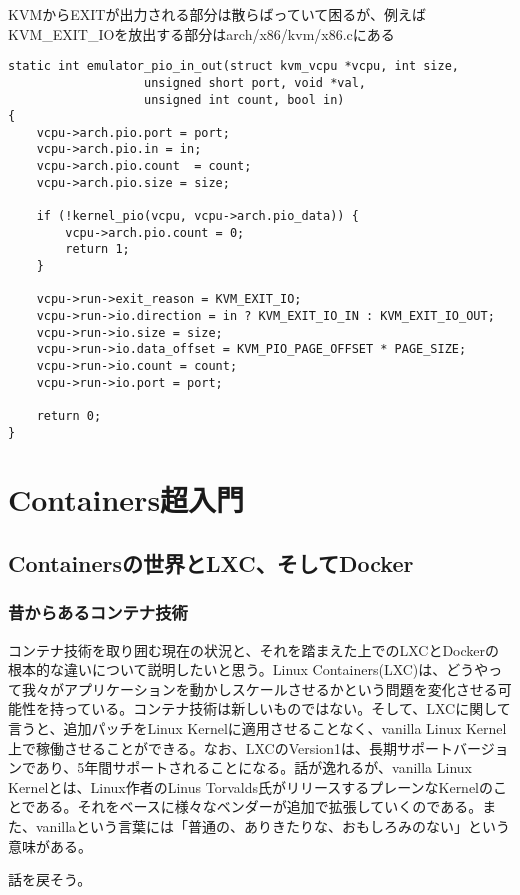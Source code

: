 \documentclass[9pt,b5paper,tombo]{jsbook}
\begin{document}
KVMからEXITが出力される部分は散らばっていて困るが、例えばKVM\_EXIT\_IOを放出する部分はarch/x86/kvm/x86.cにある

\begin{lstlisting}
static int emulator_pio_in_out(struct kvm_vcpu *vcpu, int size,
                   unsigned short port, void *val,
                   unsigned int count, bool in)
{
    vcpu->arch.pio.port = port;
    vcpu->arch.pio.in = in;
    vcpu->arch.pio.count  = count;
    vcpu->arch.pio.size = size;

    if (!kernel_pio(vcpu, vcpu->arch.pio_data)) {
        vcpu->arch.pio.count = 0;
        return 1;
    }

    vcpu->run->exit_reason = KVM_EXIT_IO;
    vcpu->run->io.direction = in ? KVM_EXIT_IO_IN : KVM_EXIT_IO_OUT;
    vcpu->run->io.size = size;
    vcpu->run->io.data_offset = KVM_PIO_PAGE_OFFSET * PAGE_SIZE;
    vcpu->run->io.count = count;
    vcpu->run->io.port = port;

    return 0;
}
\end{lstlisting}


\chapter{Containers超入門}

\section{Containersの世界とLXC、そしてDocker}

\subsection{昔からあるコンテナ技術}
コンテナ技術を取り囲む現在の状況と、それを踏まえた上でのLXCとDockerの根本的な違いについて説明したいと思う。Linux Containers(LXC)は、どうやって我々がアプリケーションを動かしスケールさせるかという問題を変化させる可能性を持っている。コンテナ技術は新しいものではない。そして、LXCに関して言うと、追加パッチをLinux Kernelに適用させることなく、vanilla Linux Kernel上で稼働させることができる。なお、LXCのVersion1は、長期サポートバージョンであり、5年間サポートされることになる。話が逸れるが、vanilla Linux Kernelとは、Linux作者のLinus Torvalds氏がリリースするプレーンなKernelのことである。それをベースに様々なベンダーが追加で拡張していくのである。また、vanillaという言葉には「普通の、ありきたりな、おもしろみのない」という意味がある。

\noindent
話を戻そう。
\end{document}
